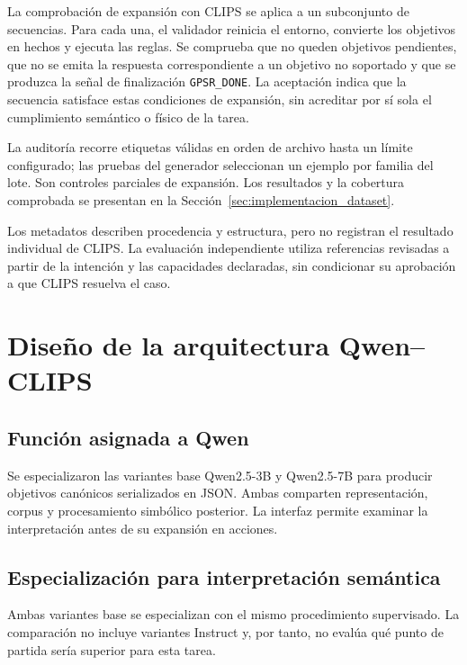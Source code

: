 La comprobación de expansión con CLIPS se aplica a un subconjunto de secuencias.
Para cada una, el validador reinicia el entorno, convierte los objetivos
en hechos y ejecuta las reglas. Se comprueba que no queden objetivos
pendientes, que no se emita la respuesta correspondiente a un objetivo no
soportado y que se produzca la señal de finalización
\texttt{GPSR\_DONE}. La aceptación indica que la secuencia satisface estas
condiciones de expansión, sin acreditar por sí sola el cumplimiento
semántico o físico de la tarea.

La auditoría recorre etiquetas válidas en orden de archivo hasta un límite configurado; las pruebas del generador seleccionan un ejemplo por familia del lote. Son controles parciales de expansión. Los resultados y la cobertura comprobada se presentan en la Sección~\ref{sec:implementacion_dataset}.

Los metadatos describen procedencia y estructura, pero no registran el resultado individual de CLIPS. La evaluación independiente utiliza referencias revisadas a partir de la intención y las capacidades declaradas, sin condicionar su aprobación a que CLIPS resuelva el caso.



\section{Diseño de la arquitectura Qwen--CLIPS}
\label{sec:diseno_qwen_clips}

\subsection{Función asignada a Qwen}

Se especializaron las variantes base Qwen2.5-3B y Qwen2.5-7B para producir objetivos canónicos serializados en JSON. Ambas comparten representación, corpus y procesamiento simbólico posterior. La interfaz permite examinar la interpretación antes de su expansión en acciones.

\subsection{Especialización para interpretación semántica}
\label{subsec:especializacion_qwen}

Ambas variantes base se especializan con el mismo procedimiento supervisado. La comparación no incluye variantes Instruct y, por tanto, no evalúa qué punto de partida sería superior para esta tarea.

